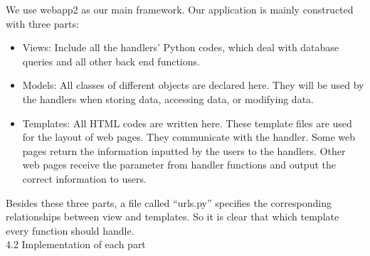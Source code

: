 \documentclass{article}
\begin{document}
We use webapp2 as our main framework. Our application is mainly constructed with three parts:
\begin{itemize}
\item Views: Include all the handlers' Python codes, which deal with database queries and all other back end functions. 
\item Models: All classes of different objects are declared here. They will be used by the handlers when storing data, accessing data, or modifying data. 
\item Templates: All HTML codes are written here. These template files are used for the layout of web pages. They communicate with the handler. Some web pages return the information inputted by the users to the handlers. Other web pages receive the parameter from handler functions and output the correct information to users.  
\end{itemize}
Besides these three parts, a file called “urls.py” specifies the corresponding relationships between view and templates. So it is clear that which template every function should handle. \\

4.2 Implementation of each part
\end{document}
